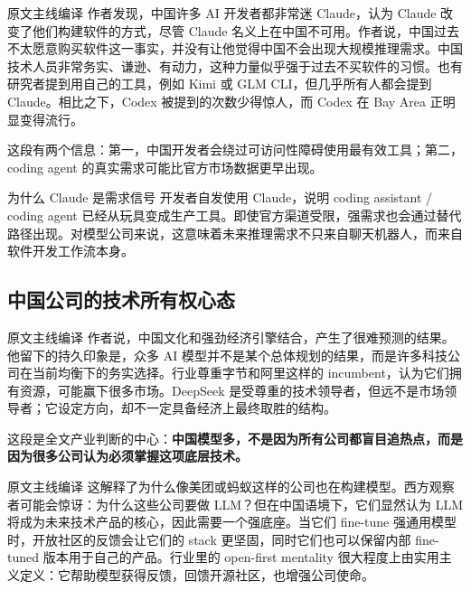 \begin{translationbox}{原文主线编译}
作者发现，中国许多 AI 开发者都非常迷 Claude，认为 Claude 改变了他们构建软件的方式，尽管 Claude 名义上在中国不可用。作者说，中国过去不太愿意购买软件这一事实，并没有让他觉得中国不会出现大规模推理需求。中国技术人员非常务实、谦逊、有动力，这种力量似乎强于过去不买软件的习惯。也有研究者提到用自己的工具，例如 Kimi 或 GLM CLI，但几乎所有人都会提到 Claude。相比之下，Codex 被提到的次数少得惊人，而 Codex 在 Bay Area 正明显变得流行。
\end{translationbox}

这段有两个信息：第一，中国开发者会绕过可访问性障碍使用最有效工具；第二，coding agent 的真实需求可能比官方市场数据更早出现。

\begin{knowledgebox}{为什么 Claude 是需求信号}
开发者自发使用 Claude，说明 coding assistant / coding agent 已经从玩具变成生产工具。即使官方渠道受限，强需求也会通过替代路径出现。对模型公司来说，这意味着未来推理需求不只来自聊天机器人，而来自软件开发工作流本身。
\end{knowledgebox}

\subsection{中国公司的技术所有权心态}

\begin{translationbox}{原文主线编译}
作者说，中国文化和强劲经济引擎结合，产生了很难预测的结果。他留下的持久印象是，众多 AI 模型并不是某个总体规划的结果，而是许多科技公司在当前均衡下的务实选择。行业尊重字节和阿里这样的 incumbent，认为它们拥有资源，可能赢下很多市场。DeepSeek 是受尊重的技术领导者，但远不是市场领导者；它设定方向，却不一定具备经济上最终取胜的结构。
\end{translationbox}

这段是全文产业判断的中心：\textbf{中国模型多，不是因为所有公司都盲目追热点，而是因为很多公司认为必须掌握这项底层技术。}

\begin{translationbox}{原文主线编译}
这解释了为什么像美团或蚂蚁这样的公司也在构建模型。西方观察者可能会惊讶：为什么这些公司要做 LLM？但在中国语境下，它们显然认为 LLM 将成为未来技术产品的核心，因此需要一个强底座。当它们 fine-tune 强通用模型时，开放社区的反馈会让它们的 stack 更坚固，同时它们也可以保留内部 fine-tuned 版本用于自己的产品。行业里的 open-first mentality 很大程度上由实用主义定义：它帮助模型获得反馈，回馈开源社区，也增强公司使命。
\end{translationbox}

